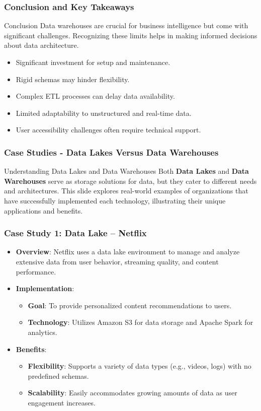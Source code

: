 \documentclass[aspectratio=169]{beamer}
\begin{document}
\begin{frame}[fragile]
    \frametitle{Conclusion and Key Takeaways}
    \begin{block}{Conclusion}
        Data warehouses are crucial for business intelligence but come with significant challenges. Recognizing these limits helps in making informed decisions about data architecture.
    \end{block}
    \begin{itemize}
        \item Significant investment for setup and maintenance.
        \item Rigid schemas may hinder flexibility.
        \item Complex ETL processes can delay data availability.
        \item Limited adaptability to unstructured and real-time data.
        \item User accessibility challenges often require technical support.
    \end{itemize}
\end{frame}

\begin{frame}[fragile]
    \frametitle{Case Studies - Data Lakes Versus Data Warehouses}
    \begin{block}{Understanding Data Lakes and Data Warehouses}
        Both \textbf{Data Lakes} and \textbf{Data Warehouses} serve as storage solutions for data, but they cater to different needs and architectures. 
        This slide explores real-world examples of organizations that have successfully implemented each technology, illustrating their unique applications and benefits.
    \end{block}
\end{frame}

\begin{frame}[fragile]
    \frametitle{Case Study 1: Data Lake – Netflix}
    \begin{itemize}
        \item \textbf{Overview}: Netflix uses a data lake environment to manage and analyze extensive data from user behavior, streaming quality, and content performance.
        \item \textbf{Implementation}:
        \begin{itemize}
            \item \textbf{Goal}: To provide personalized content recommendations to users.
            \item \textbf{Technology}: Utilizes Amazon S3 for data storage and Apache Spark for analytics.
        \end{itemize}
        \item \textbf{Benefits}:
        \begin{itemize}
            \item \textbf{Flexibility}: Supports a variety of data types (e.g., videos, logs) with no predefined schemas.
            \item \textbf{Scalability}: Easily accommodates growing amounts of data as user engagement increases.
        \end{itemize}
    \end{itemize}
\end{frame}
\end{document}
